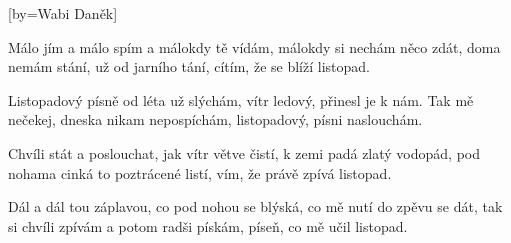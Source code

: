 [by={Wabi Daněk}]

\beginverse{}
Málo jím a málo spím a málokdy tě vídám,
málokdy si nechám něco zdát, 
doma nemám stání, už od jarního tání,
cítím, že se blíží listopad.
\endverse{}

\beginchorus{}
Listopadový písně od léta už slýchám,
vítr ledový, přinesl je k nám.
Tak mě nečekej, dneska nikam nepospíchám,
listopadový, písni naslouchám.
\endchorus{}

\beginverse*{}
   
\endverse{}

\beginverse{}
Chvíli stát a poslouchat, jak vítr větve čistí,
k zemi padá zlatý vodopád, 
pod nohama cinká to poztrácené listí,
vím, že právě zpívá listopad.
\endverse{}

\beginchorus{}
\phantom{}
\endchorus{}

\beginverse*{}
   
\endverse{}

\beginverse{}
Dál a dál tou záplavou, co pod nohou se blýská,
co mě nutí do zpěvu se dát, 
tak si chvíli zpívám a potom radši pískám,
píseň, co mě učil listopad.
\endverse{}

\beginchorus{}
\phantom{}
\endchorus{}

\beginverse*{}
   
\endverse{}

\endsong{}
